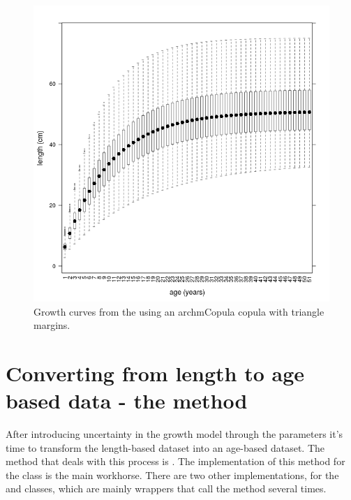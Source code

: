 \documentclass[a4paper,english,10pt]{article}\usepackage[]{graphicx}\usepackage[]{color}
\newenvironment{knitrout}{}{} %
\begin{document}
\begin{knitrout}
\color{fgcolor}\begin{figure}[H]

{\centering \includegraphics[width=.9\linewidth]{figure/plot_cop_tri_growth-1} 

}

\caption[Growth curves from the using an archmCopula copula with triangle margins]{Growth curves from the using an archmCopula copula with triangle margins.}\label{fig:plot_cop_tri_growth}
\end{figure}


\end{knitrout}

\section{Converting from length to age based data - the  method}

After introducing uncertainty in the growth model through the parameters it's time to transform the length-based dataset into an age-based dataset. The method that deals with this process is . The implementation of this method for the  class is the main workhorse. There are two other implementations, for the  and  classes, which are mainly wrappers that call the  method several times.
\end{document}
